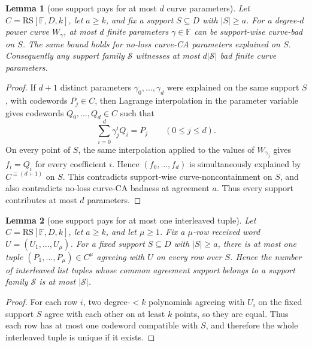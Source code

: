 \documentclass[11pt]{article}
\newtheorem{lemma}[lemma]{Lemma}
\theoremstyle{definition}
\theoremstyle{remark}
\newcommand{\F}{\mathbb{F}}
\newcommand{\RS}{\mathrm{RS}}
\begin{document}
\begin{lemma}[one support pays for at most $d$ curve parameters]
\label{lem:one-support-d-curve}
Let $C=\RS[\F,D,k]$, let $a\ge k$, and fix a support $S\subseteq D$ with
$|S|\ge a$.  For a degree-$d$ power curve $W_\gamma$, at most $d$ finite
parameters $\gamma\in\F$ can be support-wise curve-bad on $S$.  The same bound
holds for no-loss curve-CA parameters explained on $S$.  Consequently any
support family $\mathcal S$ witnesses at most $d|\mathcal S|$ bad finite curve
parameters.
\end{lemma}

\begin{proof}
If $d+1$ distinct parameters $\gamma_0,\ldots,\gamma_d$ were explained on the
same support $S$, with codewords $P_j\in C$, then Lagrange interpolation in the
parameter variable gives codewords $Q_0,\ldots,Q_d\in C$ such that
\[
        \sum_{i=0}^d \gamma_j^i Q_i=P_j
        \qquad (0\le j\le d).
\]
On every point of $S$, the same interpolation applied to the values of
$W_{\gamma_j}$ gives $f_i=Q_i$ for every coefficient $i$.  Hence
$(f_0,\ldots,f_d)$ is simultaneously explained by $C^{\equiv(d+1)}$ on $S$.
This contradicts support-wise curve-noncontainment on $S$, and also contradicts
no-loss curve-CA badness at agreement $a$.  Thus every support contributes at
most $d$ parameters.
\end{proof}

\begin{lemma}[one support pays for at most one interleaved tuple]
\label{lem:one-support-one-interleaved}
Let $C=\RS[\F,D,k]$, let $a\ge k$, and let $\mu\ge1$.  Fix a $\mu$-row received
word $U=(U_1,\ldots,U_\mu)$.  For a fixed support $S\subseteq D$ with
$|S|\ge a$, there is at most one tuple $(P_1,\ldots,P_\mu)\in C^\mu$ agreeing
with $U$ on every row over $S$.  Hence the number of interleaved list tuples whose
common agreement support belongs to a support family $\mathcal S$ is at most
$|\mathcal S|$.
\end{lemma}

\begin{proof}
For each row $i$, two degree-$<k$ polynomials agreeing with $U_i$ on the fixed
support $S$ agree with each other on at least $k$ points, so they are equal.  Thus
each row has at most one codeword compatible with $S$, and therefore the whole
interleaved tuple is unique if it exists.
\end{proof}
\end{document}
